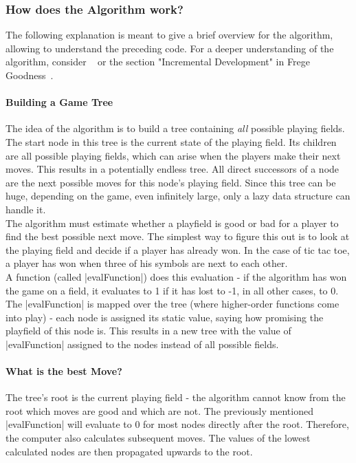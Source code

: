 \subsubsection{How does the Algorithm work?} %
\label{subsub:How does the Algorithm work?}
The following explanation is meant to give a brief overview for the
algorithm, allowing to understand the preceding code. For a deeper
understanding of the algorithm, consider ~\cite[Ch. 5]{hughes_why_1989} or the
section "Incremental Development" in Frege Goodness~\cite{frege_goodness}.

\paragraph{Building a Game Tree} The idea of the algorithm is to build a tree
containing \textit{all} possible playing fields. The start node in this
tree is the current state of the playing field. Its children are all possible
playing fields, which can arise when the players make their next moves. This
results in a potentially endless tree. All direct successors of a node are the
next possible moves for this node's playing field. Since this tree can be huge,
depending on the game, even infinitely large, only a lazy data structure can
handle it.\\
The algorithm must estimate whether a playfield is good or bad for a player to
find the best possible next move. The simplest way to figure this out is to
look at the playing field and decide if a player has already won. In the case
of tic tac toe, a player has won when three of his symbols are next to each
other. \\
A function (called |evalFunction|) does this evaluation - if the algorithm has
won the game on a field, it evaluates to 1 if it has lost to -1, in all other
cases, to 0.\\
The |evalFunction| is mapped over the tree (where higher-order functions come
into play) - each node is assigned its static value, saying how promising the
playfield of this node is. This results in a new tree with the value of
|evalFunction| assigned to the nodes instead of all possible fields.\\

\paragraph{What is the best Move?}
The tree's root is the current playing field - the algorithm cannot know from
the root which moves are good and which are not. The previously mentioned
|evalFunction| will evaluate to 0 for most nodes directly after the root.
Therefore, the computer also calculates subsequent moves. The values of the
lowest calculated nodes are then propagated upwards to the root. 

